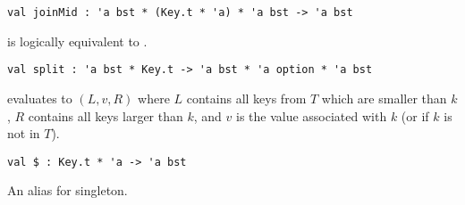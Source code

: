 \begin{cluster}
\label{grp:grm:bst-interface::joinmid}

\begin{gram}[joinMid]
\label{grm:bst-interface::joinmid}
\begin{verbatim}
val joinMid : 'a bst * (Key.t * 'a) * 'a bst -> 'a bst
\end{verbatim}
 is logically equivalent to
.

\end{gram}
\end{cluster}

\begin{cluster}
\label{grp:grm:bst-interface::split}

\begin{gram}[split]
\label{grm:bst-interface::split}
\begin{verbatim}
val split : 'a bst * Key.t -> 'a bst * 'a option * 'a bst
\end{verbatim}
 evaluates to $(L,v,R)$ where $L$ contains all keys from $T$
which are smaller than $k$, $R$ contains all keys larger than
$k$, and $v$ is the value associated with $k$ (or  if $k$ is not
in $T$).

\end{gram}
\end{cluster}

\begin{cluster}
\label{grp:grm:bst-interface::alias}

\begin{gram}[\$]
\label{grm:bst-interface::alias}
\begin{verbatim}
val $ : Key.t * 'a -> 'a bst
\end{verbatim}
An alias for singleton.

\end{gram}
\end{cluster}

